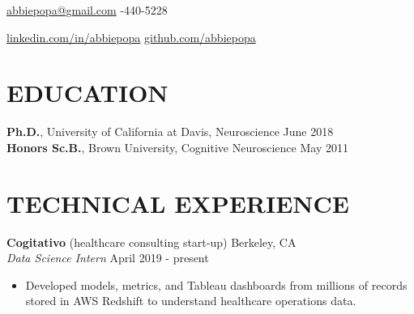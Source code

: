\documentclass[line,margin,10pt]{res}
\begin{document}
 
\begin{resume}
\hoffset\centerline 
{\hyperref[abbiepopa@gmail.com]{abbiepopa@gmail.com} \quad \quad \quad \quad  \quad \quad \quad \quad \quad \quad \quad \quad \quad \quad \quad \quad \quad \quad \quad \quad \quad\quad \quad \quad \quad \quad \quad \quad \quad \quad \quad \quad  \quad \quad {}-440-5228}
\hoffset\centerline 
{\hspace{0.05cm} \hyperref[linkedin.com/in/abbiepopa]{linkedin.com/in/abbiepopa} \quad \quad \quad \quad \quad \quad \quad \quad \quad \quad \quad\quad \quad \quad \quad \quad \quad \quad \quad \quad \quad \quad  \quad \quad \quad  \quad \quad \quad   \quad \hyperref[github.com/abbiepopa]{github.com/abbiepopa}}
 
\section{EDUCATION} 
\textbf{Ph.D.}, University of California at Davis, Neuroscience \hfill June 2018\\
\textbf{Honors Sc.B.}, Brown University, Cognitive Neuroscience \hfill May 2011\\


\section{TECHNICAL EXPERIENCE}
\textbf{Cogitativo} (healthcare consulting start-up) \hfill Berkeley, CA\\
{\sl Data Science Intern} \hfill April 2019 - present 
\begin{itemize} \itemsep -2pt
\item Developed models, metrics, and Tableau dashboards from millions of records stored in AWS Redshift to understand healthcare operations data.
\end{itemize}


\end{resume}
\end{document}
